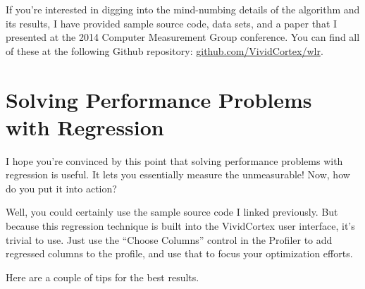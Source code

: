 \documentclass{vivid_layout}
\begin{document}
If you're interested in digging into the mind-numbing details of the algorithm and its results, I have provided sample source code, data sets, and a paper that I presented at the 2014 Computer Measurement Group conference. You can find all of these at the following Github repository: \href{https://github.com/VividCortex/wlr}{github.com/VividCortex/wlr}.

\section{Solving Performance Problems with Regression}

I hope you're convinced by this point that solving performance problems with
regression is useful. It lets you essentially measure the unmeasurable! Now, how
do you put it into action?

Well, you could certainly use the sample source code I linked previously. But
because this regression technique is built into the VividCortex user interface,
it's trivial to use. Just use the ``Choose Columns'' control in the Profiler to
add regressed columns to the profile, and use that to focus your optimization
efforts.

Here are a couple of tips for the best results.
\end{document}
